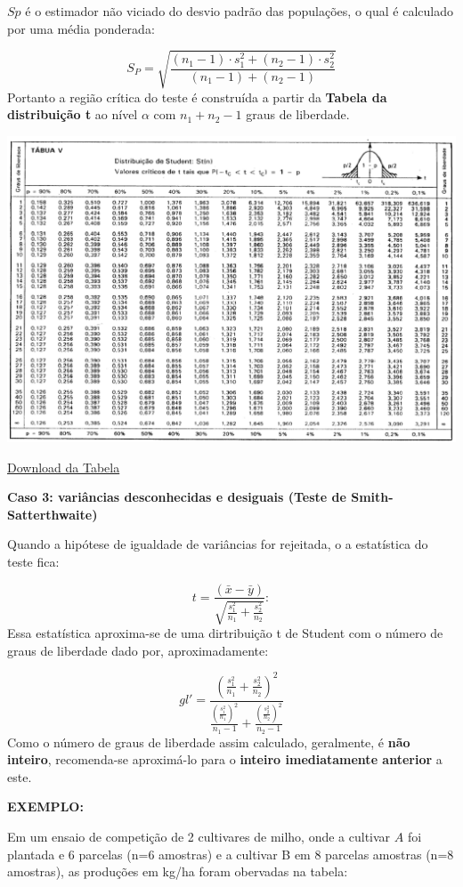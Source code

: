\documentclass[
]{book}
\begin{document}
\(Sp\) é o estimador não viciado do desvio padrão das populações, o qual é calculado por uma média ponderada:

\[
S_P=\sqrt{\frac{(n_1 - 1)\cdot s^2_1+(n_2-1)\cdot s^2_2}{(n_1 - 1)+(n_2-1)}}
\]
Portanto a região crítica do teste é construída a partir da \textbf{Tabela da distribuição t} ao nível \(\alpha\) com \(n_1+n_2 - 1\) graus de liberdade.

\includegraphics{tabT.png}

\href{https://github.com/arpanosso/ExpAgr_2020/raw/master/Tabela_tdeStudent.pdf}{Download da Tabela}

\textbf{Caso 3: variâncias desconhecidas e desiguais (Teste de Smith-Satterthwaite)}

Quando a hipótese de igualdade de variâncias for rejeitada, o a estatística do teste fica:

\[
t = \frac{(\bar{x}-\bar{y})}{\sqrt{\frac{s^2_1}{n_1}+\frac{s^2_2}{n_2}}}:
\]
Essa estatística aproxima-se de uma dirtribuição t de Student com o número de graus de liberdade dado por, aproximadamente:

\[
gl'=\frac{(\frac{s^2_1}{n_1}+\frac{s_2^2}{n_2})^2}{\frac{(\frac{s^2_1}{n_1})^2}{n_1-1}+\frac{(\frac{s^2_2}{n_2})^2}{n_2-1}}
\]
Como o número de graus de liberdade assim calculado, geralmente, é \textbf{não inteiro}, recomenda-se aproximá-lo para o \textbf{inteiro imediatamente anterior} a este.

\textbf{EXEMPLO:}

Em um ensaio de competição de 2 cultivares de milho, onde a cultivar \(A\) foi plantada e 6 parcelas (n=6 amostras) e a cultivar B em 8 parcelas amostras (n=8 amostras), as produções em kg/ha foram obervadas na tabela:
\end{document}
